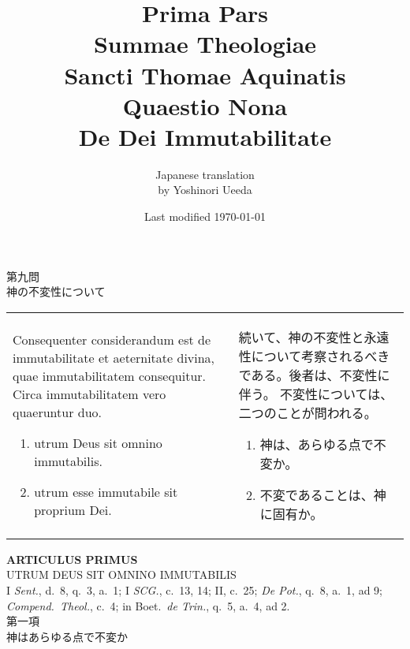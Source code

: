 \documentclass[10pt]{jsarticle} %
\title{{\bf Prima Pars}\\{\HUGE Summae Theologiae}\\Sancti Thomae
Aquinatis\\Quaestio Nona\\{\bf De Dei Immutabilitate}}
\author{Japanese translation\\by Yoshinori {\sc Ueeda}}
\date{Last modified \today}
\begin{document}
\maketitle

\begin{center}
 {\Large 第九問\\神の不変性について}
\end{center}

\begin{longtable}{p{21em}p{21em}}
Consequenter considerandum est de immutabilitate et aeternitate divina, quae immutabilitatem consequitur. Circa immutabilitatem vero quaeruntur duo. 
\begin{enumerate}
 \item utrum Deus sit omnino immutabilis. 
 \item utrum esse immutabile sit proprium Dei.
\end{enumerate}
&
続いて、神の不変性と永遠性について考察されるべきである。後者は、不変性に
 伴う。
不変性については、二つのことが問われる。

\begin{enumerate}
\item 神は、あらゆる点で不変か。
\item 不変であることは、神に固有か。
\end{enumerate}
\end{longtable}
\newpage
{}


\begin{center}
 {\Large {\bf ARTICULUS PRIMUS}}\\
 {\large UTRUM DEUS SIT OMNINO IMMUTABILIS}\\
 {\footnotesize I {\itshape Sent.}, d.~8, q.~3, a.~1; I {\itshape SCG.},
 c.~13, 14; II, c.~25; {\itshape De Pot.}, q.~8, a.~1, ad 9; {\itshape
 Compend.~Theol.}, c.~4; in Boet.~{\itshape de Trin.}, q.~5, a.~4, ad 2.}\\
 {\Large 第一項\\神はあらゆる点で不変か}
\end{center}
\end{document}
